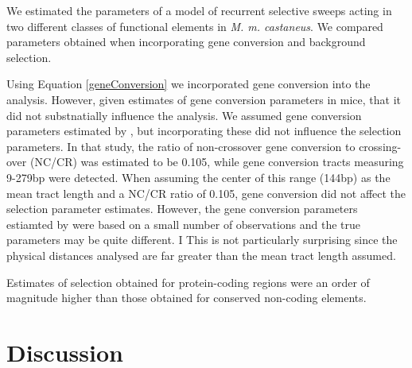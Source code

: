 	We estimated the parameters of a model of recurrent selective sweeps acting in two different classes of functional elements in \textit{M. m. castaneus}. We compared parameters obtained when incorporating gene conversion and background selection.
	
	Using  Equation \ref{geneConversion} we incorporated gene conversion into the analysis. However, given estimates of gene conversion parameters in mice, that it did not substnatially influence the analysis. We assumed gene conversion parameters estimated by \cite{RN263}, but incorporating these did not influence the selection parameters. In that study, the ratio of non-crossover gene conversion to crossing-over (NC/CR) was estimated to be 0.105, while gene conversion tracts measuring 9-279bp were detected. When assuming the center of this range (144bp) as the mean tract length and a NC/CR ratio of 0.105, gene conversion did not affect the selection parameter estimates. However, the gene conversion parameters estiamted by \cite{RN263} were based on a small number of observations and the true parameters may be quite different. I
	This is not particularly surprising since the physical distances analysed are far greater than the mean tract length assumed.  

Estimates of selection obtained for protein-coding regions were an order of magnitude higher than those obtained for conserved non-coding elements. 




%
%

%
%

\section{Discussion}

